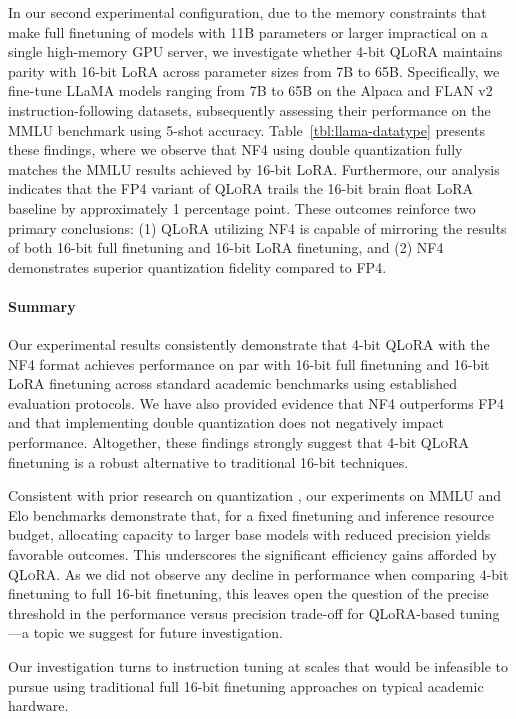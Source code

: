 In our second experimental configuration, due to the memory constraints that make full finetuning of models with 11B parameters or larger impractical on a single high-memory GPU server, we investigate whether 4-bit \textsc{QLoRA} maintains parity with 16-bit LoRA across parameter sizes from 7B to 65B. Specifically, we fine-tune LLaMA models ranging from 7B to 65B on the Alpaca and FLAN v2 instruction-following datasets, subsequently assessing their performance on the MMLU benchmark using 5-shot accuracy. Table~\ref{tbl:llama-datatype} presents these findings, where we observe that NF4 using double quantization fully matches the MMLU results achieved by 16-bit LoRA. Furthermore, our analysis indicates that the FP4 variant of \textsc{QLoRA} trails the 16-bit brain float LoRA baseline by approximately 1 percentage point. These outcomes reinforce two primary conclusions: (1) \textsc{QLoRA} utilizing NF4 is capable of mirroring the results of both 16-bit full finetuning and 16-bit LoRA finetuning, and (2) NF4 demonstrates superior quantization fidelity compared to FP4.

\paragraph{Summary} Our experimental results consistently demonstrate that 4-bit \textsc{QLoRA} with the NF4 format achieves performance on par with 16-bit full finetuning and 16-bit LoRA finetuning across standard academic benchmarks using established evaluation protocols. We have also provided evidence that NF4 outperforms FP4 and that implementing double quantization does not negatively impact performance. Altogether, these findings strongly suggest that 4-bit \textsc{QLoRA} finetuning is a robust alternative to traditional 16-bit techniques.

Consistent with prior research on quantization \citep{dettmers2022case}, our experiments on MMLU and Elo benchmarks demonstrate that, for a fixed finetuning and inference resource budget, allocating capacity to larger base models with reduced precision yields favorable outcomes. This underscores the significant efficiency gains afforded by \textsc{QLoRA}. As we did not observe any decline in performance when comparing 4-bit finetuning to full 16-bit finetuning, this leaves open the question of the precise threshold in the performance versus precision trade-off for QLoRA-based tuning—a topic we suggest for future investigation.

Our investigation turns to instruction tuning at scales that would be infeasible to pursue using traditional full 16-bit finetuning approaches on typical academic hardware.

